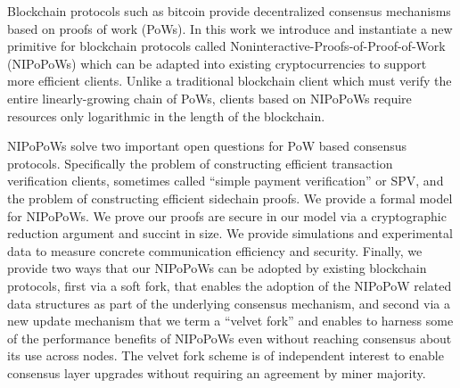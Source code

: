 Blockchain protocols such as bitcoin provide decentralized consensus
mechanisms based on proofs of work (PoWs).
%
In this work we introduce and instantiate a new primitive for blockchain protocols called Noninteractive-Proofs-of-Proof-of-Work (NIPoPoWs) which can be adapted into existing cryptocurrencies to support more efficient clients.
Unlike a traditional blockchain client which must verify the entire
linearly-growing chain of PoWs, clients based on NIPoPoWs require resources
only logarithmic in the length of the blockchain.

NIPoPoWs solve two important open questions for PoW based consensus
protocols. Specifically the problem  
of constructing efficient transaction verification clients, sometimes called
``simple payment verification'' or SPV, and the problem of constructing
efficient sidechain proofs. 
%
%
We provide a formal model for NIPoPoWs. We prove our proofs are secure in our
model via a cryptographic reduction argument and succint in size. We provide
simulations and experimental data to measure concrete communication efficiency
and security. 
Finally, we provide two ways that our NIPoPoWs can be adopted by
existing blockchain protocols, first via a soft fork, that enables the 
adoption of the NIPoPoW related data structures
as part of the underlying consensus mechanism, 
and second via a new update mechanism 
that we term a ``velvet fork'' and enables to harness some of
the performance benefits of NIPoPoWs even without reaching consensus about its use
across nodes. The velvet fork scheme is of independent interest to enable
consensus layer upgrades without requiring an agreement by miner majority.


